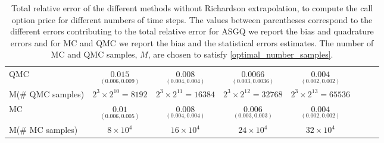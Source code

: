 \begin{table}[h!]
\begin{small}
\begin{tabular}{l*{6}{c}r}
			
			\hline
			QMC    & $\underset{(0.006,0.009)}{\mathbf{0.015}}$  & $\underset{(0.004,0.004)}{ \mathbf{0.008}}$  & $\underset{(0.003,0.0036)}{\mathbf{0.0066}}$ & $\underset{(0.002,0.002)}{\mathbf{0.004}}$  \\	
			M(\# QMC samples) 	& $2^3 \times 2^{10}= 8192$  &  $2^3 \times 2^{11}=  16384$ &  $2^3 \times 2^{12}= 32768$ & $2^3 \times 2^{13}= 65536	$  \\
			\hline
			MC    & $\underset{(0.006,0.005)}{\mathbf{0.01}}$  & $\underset{(0.004,0.004)}{ \mathbf{0.008}}$  & $\underset{(0.003,0.003)}{\mathbf{0.006}}$ & $\underset{(0.002,0.002)}{\mathbf{0.004}}$  \\	
			M(\# MC samples) 	& $8 \times 10^4$  & $16 \times 10^4$  & $24 \times 10^4$ & $32 \times 10^4$  \\
			\bottomrule[1.25pt]
		\end{tabular}
		\caption{Total relative error of  the different methods without Richardson extrapolation,  to compute the call option price  for different numbers of time steps. The values between parentheses correspond to the different errors contributing to the total relative error\red{;} for ASGQ we report the bias and quadrature errors and for MC and QMC we report the bias and the statistical errors estimates. The number of MC and QMC  samples, $M$, are chosen to satisfy \eqref{optimal_number_samples}.}
		\label{Total error of MISC and MC to compute Call option price of the different tolerances for different number of time steps. Case set 4, without Richardson extrapolation. The numbers between parentheses are the corresponding absolute errors.}
	\end{small}
\end{table}


